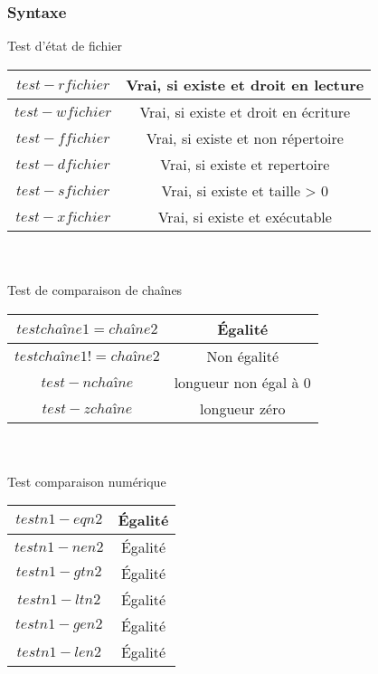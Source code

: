 			\subsubsection{Syntaxe}
				Test d'état de fichier\\
				\begin{tabular}{|c|c|}
					\hline 
						$test -r fichier$  & Vrai, si existe et droit en lecture\\
					\hline 
					\hline 
						$test -w fichier$  & Vrai, si existe et droit en écriture\\
					\hline 
					\hline 
						$test -f fichier$  & Vrai, si existe et non répertoire \\
					\hline 
					\hline 
						$test -d fichier$  & Vrai, si existe et repertoire \\
					\hline 
					\hline 
						$test -s fichier$  & Vrai, si existe et taille > 0  \\
					\hline 
					\hline 
						$test -x fichier$  &Vrai, si existe et exécutable \\
					\hline 
				\end{tabular}\\ \\
				Test de comparaison de chaînes\\
				\begin{tabular}{|c|c|}
					\hline 
						$test chaîne1 = chaîne2$  & Égalité \\ 
					\hline 
					\hline 
						$test chaîne1 != chaîne2$  & Non égalité \\ 
					\hline 
					\hline 
						$test -n chaîne$  & longueur non égal à 0\\ 
					\hline 
					\hline 
						$test -z chaîne$  & longueur zéro \\ 
					\hline 
				\end{tabular}\\ \\
				Test comparaison numérique\\
				\begin{tabular}{|c|c|}
					\hline 
						$test n1 -eq n2$  & Égalité \\ 
					\hline 
					\hline 
						$test n1 -ne n2$  & Égalité \\ 
					\hline 
					\hline 
						$test n1 -gt n2$  & Égalité \\ 
					\hline 
					\hline 
						$test n1 -lt n2$  & Égalité \\ 
					\hline 
					\hline 
						$test n1 -ge n2$  & Égalité \\ 
					\hline 
					\hline 
						$test n1 -le n2$  & Égalité \\ 
					\hline 
				\end{tabular}\\ \\
